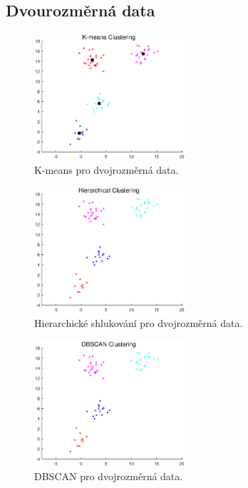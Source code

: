 \subsection{Dvourozměrná data}

\begin{figure}[H]
    \centering
    \includegraphics[width=0.5\textwidth]{images/2D_kmeans.eps}
    \caption{K-means pro dvojrozměrná data.}
\end{figure}

\begin{figure}[H]
    \centering
    \includegraphics[width=0.5\textwidth]{images/2D_hierar.eps}
    \caption{Hierarchické shlukování pro dvojrozměrná data.}
\end{figure}

\begin{figure}[H]
    \centering
    \includegraphics[width=0.5\textwidth]{images/2D_DBSCAN.eps}
    \caption{DBSCAN pro dvojrozměrná data.}
\end{figure}

